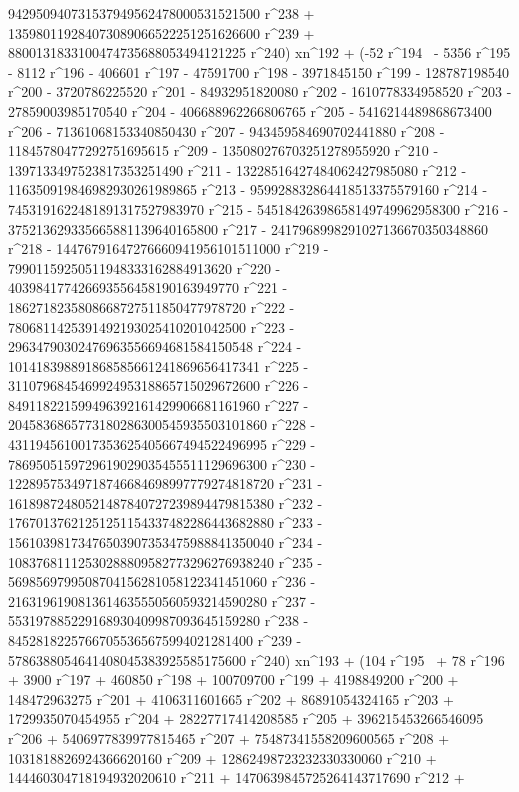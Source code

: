        942950940731537949562478000531521500 r^238 + 
       135980119284073089066522251251626600 r^239 + 
       8800131833100474735688053494121225 r^240) xn^192 + (-52 r^194 \
- 5356 r^195 - 8112 r^196 - 406601 r^197 - 47591700 r^198 - 
       3971845150 r^199 - 128787198540 r^200 - 3720786225520 r^201 - 
       84932951820080 r^202 - 1610778334958520 r^203 - 
       27859003985170540 r^204 - 406688962266806765 r^205 - 
       5416214489868673400 r^206 - 71361068153340850430 r^207 - 
       943459584690702441880 r^208 - 11845780477292751695615 r^209 - 
       135080276703251278955920 r^210 - 
       1397133497523817353251490 r^211 - 
       13228516427484062427985080 r^212 - 
       116350919846982930261989865 r^213 - 
       959928832864418513375579160 r^214 - 
       7453191622481891317527983970 r^215 - 
       54518426398658149749962958300 r^216 - 
       375213629335665881139640165800 r^217 - 
       2417968998291027136670350348860 r^218 - 
       14476791647276660941956101511000 r^219 - 
       79901159250511948333162884913620 r^220 - 
       403984177426693556458190163949770 r^221 - 
       1862718235808668727511850477978720 r^222 - 
       7806811425391492193025410201042500 r^223 - 
       29634790302476963556694681584150548 r^224 - 
       101418398891868585661241869656417341 r^225 - 
       311079684546992495318865715029672600 r^226 - 
       849118221599496392161429906681161960 r^227 - 
       2045836865773180286300545935503101860 r^228 - 
       4311945610017353625405667494522496995 r^229 - 
       7869505159729619029035455511129696300 r^230 - 
       12289575349718746684698997779274818720 r^231 - 
       16189872480521487840727239894479815380 r^232 - 
       17670137621251251154337482286443682880 r^233 - 
       15610398173476503907353475988841350040 r^234 - 
       10837681112530288809582773296276938240 r^235 - 
       5698569799508704156281058122341451060 r^236 - 
       2163196190813614635550560593214590280 r^237 - 
       553197885229168930409987093645159280 r^238 - 
       84528182257667055365675994021281400 r^239 - 
       5786388054641408045383925585175600 r^240) xn^193 + (104 r^195 \
+ 78 r^196 + 3900 r^197 + 460850 r^198 + 100709700 r^199 + 
       4198849200 r^200 + 148472963275 r^201 + 4106311601665 r^202 + 
       86891054324165 r^203 + 1729935070454955 r^204 + 
       28227717414208585 r^205 + 396215453266546095 r^206 + 
       5406977839977815465 r^207 + 75487341558209600565 r^208 + 
       1031818826924366620160 r^209 + 12862498723232330330060 r^210 + 
       144460304718194932020610 r^211 + 
       1470639845725264143717690 r^212 + 
